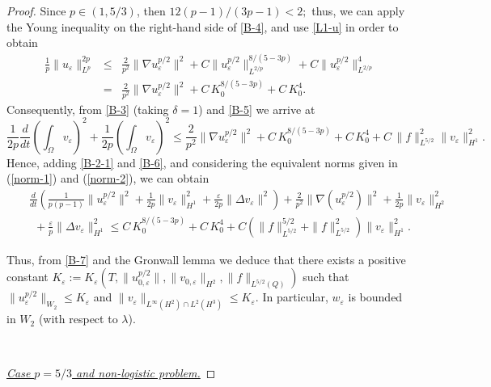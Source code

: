 \documentclass[11pt,reqno]{amsart}%
\numberwithin{equation}{section}
\begin{document}
{\begin{proof}
Since  $p\in (1,5/3)$, then $12(p-1)/(3p-1)<2;$ 
thus, we can apply the Young inequality on the right-hand side of \eqref{B-4}, and use \eqref{L1-u} in order to obtain 
\begin{eqnarray}
\frac{1}{p}\|u_\varepsilon\|^{2p}_{L^p}
&\le&\frac{2}{p^2}\|\nabla u_\varepsilon^{p/2}\|^2+C\|u_\varepsilon^{p/2}\|^{8/(5-3p)}_{L^{2/p}}
+C\|u_\varepsilon^{p/2}\|^4_{L^{2/p}}\nonumber\\
&=&\frac{2}{p^2}\|\nabla u_\varepsilon^{p/2}\|^2
+C\, K_0^{8/(5-3p)}
+C\, K_0^4.\label{B-5}
\end{eqnarray}
Consequently, from \eqref{B-3} (taking $\delta=1$) and \eqref{B-5} we arrive at
\begin{equation} \label{B-6}
\frac{1}{2p}\frac{d}{dt}\left(\int_\Omega v_\varepsilon\right)^2+\frac{1}{2p}\left(\int_\Omega v_\varepsilon\right)^2
\le\frac{2}{p^2}\|\nabla u_\varepsilon^{p/2}\|^2
+C\, K_0^{8/(5-3p)}
+C\, K_0^4
+ C\, \|f\|^2_{L^{5/2}}\|v_\varepsilon\|^2_{H^1}.
\end{equation}
Hence, adding \eqref{B-2-1} and \eqref{B-6}, and  considering the equivalent norms given in (\ref{norm-1}) and (\ref{norm-2}),  we can obtain 
\begin{eqnarray}
&&\frac{d}{dt}\left(\frac{1}{p(p-1)}\|u_\varepsilon^{p/2}\|^2
+{\frac{1}{2p}\|v_\varepsilon\|^2_{H^1}}
+\frac{\varepsilon}{2p}\|\Delta v_\varepsilon\|^2\right)
+\frac{2}{p^2}\|\nabla(u_\varepsilon^{p/2})\|^2
+\frac{1}{2p}\|v_\varepsilon\|^2_{H^2}
\nonumber\\
&&\ \ 
+\frac{\varepsilon}{p}\|\Delta v_\varepsilon\|_{H^1}^2
\le
C\, K_0^{8/(5-3p)}
+C\, K_0^4
 +{C\left(\|f\|^{5/2}_{L^{5/2}}+\|f\|^2_{L^{5/2}}\right)\|v_\varepsilon\|^2_{H^1}}.\label{B-7}
\end{eqnarray}

Thus, from \eqref{B-7} and the Gronwall lemma we deduce that there exists a positive constant $K_\varepsilon:=K_\varepsilon(T,\|u_{0,\varepsilon}^{p/2}\|,\|v_{0,\varepsilon}\|_{H^2},{\|f\|_{L^{5/2}(Q)}})$ such that
$
\|u_\varepsilon^{p/2}\|_{W_2}\le K_\varepsilon
$
and 
$
\|v_\varepsilon\|_{L^\infty(H^2)\cap L^2(H^3)}\le K_\varepsilon.
$
In particular, $w_\varepsilon$ is bounded in $W_2$ (with respect to $\lambda$).

\

{\it \underline{Case $p=5/3$ and non-logistic problem.}}
 

\end{proof}}
\end{document}
